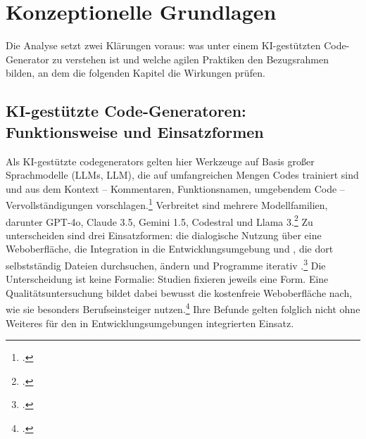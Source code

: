\section{Konzeptionelle Grundlagen}\label{sec:grundlagen}
Die Analyse setzt zwei Klärungen voraus: was unter einem KI-gestützten Code-Generator zu verstehen ist und welche agilen Praktiken den Bezugsrahmen bilden, an dem die folgenden Kapitel die Wirkungen prüfen.

\subsection{KI-gestützte Code-Generatoren: Funktionsweise und Einsatzformen}\label{subsec:generatoren}
Als KI-gestützte \glspl{codegenerator} gelten hier Werkzeuge auf Basis großer Sprachmodelle (\aclp{LLM}, \acs{LLM}), die auf umfangreichen Mengen  Codes trainiert sind und aus dem Kontext -- Kommentaren, Funktionsnamen, umgebendem Code -- Vervollständigungen vorschlagen.\footcite[\vglf][]{Pearce.2022} Verbreitet sind mehrere Modellfamilien, darunter GPT-4o, Claude 3.5, Gemini 1.5, Codestral und Llama 3.\footcite[\vglf][]{Kharma.2026} Zu unterscheiden sind drei Einsatzformen: die dialogische Nutzung über eine Weboberfläche, die Integration in die Entwicklungsumgebung und , die dort selbstständig Dateien durchsuchen, ändern und Programme iterativ .\footcite[\vglf][]{Becker.2025} Die Unterscheidung ist keine Formalie: Studien fixieren jeweils eine Form. Eine Qualitätsuntersuchung bildet dabei bewusst die kostenfreie Weboberfläche nach, wie sie besonders Berufseinsteiger nutzen.\footcite[\vglf][]{Swaraj.2026} Ihre Befunde gelten folglich nicht ohne Weiteres für den in Entwicklungsumgebungen integrierten Einsatz.

